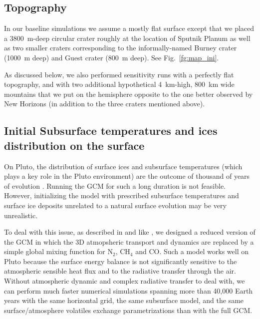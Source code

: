 \subsection{Topography}

In our baseline simulations we assume a mostly flat surface except that we placed a 
3800~m-deep circular crater roughly at the location of Sputnik Planum 
\citep[in agreement with][]{Moor:16}
as well as two smaller craters corresponding to the informally-named Burney crater
(1000~m deep) and Guest crater (800~m deep). 
See Fig.~\ref{fg:map_ini}. 

As discussed below, we also performed sensitivity runs with a perfectly flat topography, and
with two additional  hypothetical 4~km-high, 800~km wide mountains that we put on
the hemisphere opposite to the one better observed by New Horizons (in addition to the
three craters mentioned above).

\subsection{Initial Subsurface temperatures and ices distribution on the surface}

On Pluto, the distribution of surface ices and subsurface temperatures (which plays a key role in the Pluto
environment) are the outcome of thousand of years of evolution
\citep{Hans:96,Youn:13,Toig:15}.
 Running the GCM for such a
long duration is not feasible. However, initializing the model with prescribed subsurface temperatures
and surface ice deposits unrelated to a natural surface evolution may be very unrealistic. 

To deal with 
this issue, as described in \cite{Vang:11} and like \cite{Toig:15}, 
 we designed a reduced version of the GCM in which the 3D atmopsheric
transport and dynamics are replaced by a simple global mixing function for N$_2$, CH$_4$ and CO. Such a
model works well on Pluto because the surface energy balance is not significantly 
sensitive to the atmospheric
sensible heat flux and to the radiative transfer through the air. 
Without atmospheric dynamic and complex 
radiative transfer to deal with, we can perform much faster numerical simulations spanning more than 
40,000 Earth years with the same
horizontal grid, the same subsurface model, and the same surface/atmosphere volatiles exchange
parametrizations than with the full GCM.


